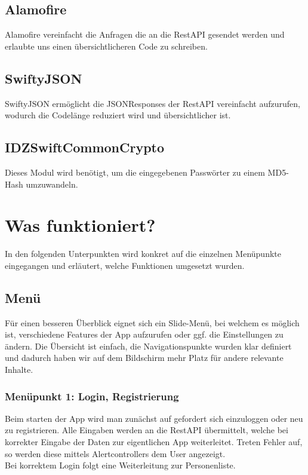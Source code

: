 \documentclass[a4paper, 11pt]{report}
\begin{document}
	\subsection*{Alamofire}
	
	Alamofire vereinfacht die Anfragen die an die RestAPI gesendet werden und erlaubte uns einen übersichtlicheren Code zu schreiben.
	
	\subsection*{SwiftyJSON}
	
	SwiftyJSON ermöglicht die JSONResponses der RestAPI vereinfacht aufzurufen, wodurch die Codelänge reduziert wird und übersichtlicher ist.
	
	\subsection*{IDZSwiftCommonCrypto}
	
	Dieses Modul wird benötigt, um die eingegebenen Passwörter zu einem MD5-Hash umzuwandeln.
	
	\section*{Was funktioniert?}
	
	In den folgenden Unterpunkten wird konkret auf die einzelnen Menüpunkte eingegangen und erläutert, welche Funktionen umgesetzt wurden.
	
	\subsection*{Menü}
	
	Für einen besseren Überblick eignet sich ein Slide-Menü, bei welchem es möglich ist, verschiedene Features der App aufzurufen oder ggf. die Einstellungen zu ändern. Die Übersicht ist einfach, die Navigationspunkte wurden klar definiert und dadurch haben wir auf dem Bildschirm mehr Platz für andere relevante Inhalte.
	
	\subsubsection*{Menüpunkt 1: Login, Registrierung}
	
	Beim starten der App wird man zunächst auf gefordert sich einzuloggen oder neu zu registrieren. Alle Eingaben werden an die RestAPI übermittelt, welche bei korrekter Eingabe der Daten zur eigentlichen App weiterleitet. Treten Fehler auf, so werden diese mittels Alertcontrollers dem User angezeigt.\\
	Bei korrektem Login folgt eine Weiterleitung zur Personenliste.
	
\end{document}
